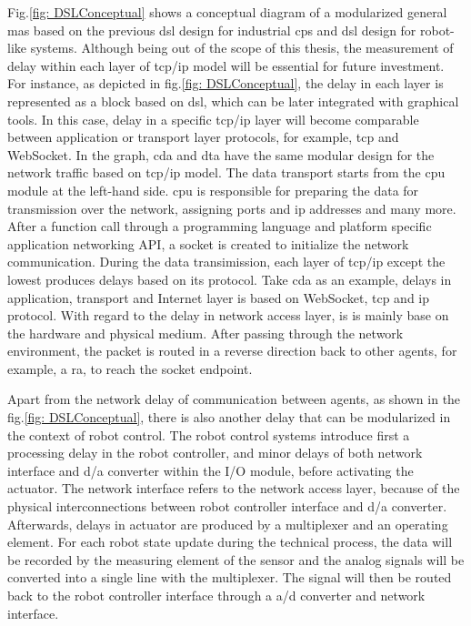 Fig.\ref{fig: DSLConceptual} shows a conceptual diagram of a modularized 
general \gls{mas} based on the previous \gls{dsl} design \cite{hujo_toward_2022} 
for industrial \gls{cps} and \gls{dsl} design for robot-like 
systems\cite{volpert_supporting_nodate}. 
Although being out of the scope of this thesis, the measurement of delay within 
each layer of \gls{tcp/ip} model will be essential for future investment.
For instance, as depicted in fig.\ref{fig: DSLConceptual}, the delay in 
each layer is represented as a block based on \gls{dsl}, which can be later integrated 
with graphical tools.
In this case, delay in a specific \gls{tcp/ip} layer will become comparable between 
application or transport layer protocols, for example, 
\gls{tcp} and WebSocket. In the graph, \gls{cda} and \gls{dta} 
have the same modular design for the network traffic based on \gls{tcp/ip} 
model. The data transport starts from the \gls{cpu} module at the left-hand side. 
\gls{cpu} is responsible for preparing the data for transmission over the network, 
assigning ports and \gls{ip} addresses and many more. After a function call 
through a programming language and platform specific application 
networking API, a socket is created to initialize the network communication. 
During the data transimission, each layer of \gls{tcp/ip} except the lowest 
produces delays 
based on its protocol. Take \gls{cda} as an example, delays in application, 
transport and Internet layer is based on WebSocket, \gls{tcp} and 
\gls{ip} protocol. With regard to the delay in network access layer, is is mainly 
base on the hardware and physical medium. After passing through the network 
environment, the packet is routed in a reverse direction back to other agents, 
for example, a \gls{ra}, to reach the socket endpoint.  



Apart from the network delay of communication between 
agents, as shown in the fig.\ref{fig: DSLConceptual}, there is also another 
delay that can be modularized in 
the context of robot control. The robot control systems introduce first a processing 
delay in the robot controller, and minor delays of both network interface and 
\gls{d/a} converter within the I/O module, before activating 
the actuator. The network interface refers to the network access layer, because of 
the physical interconnections between robot controller interface and \gls{d/a} converter. 
Afterwards, delays in actuator are produced by a multiplexer and an operating element. 
For each robot state update during the technical process, the data will be recorded 
by the measuring element of the sensor and the analog signals will be 
converted into a single line with the multiplexer. The signal will then be routed 
back to the robot controller interface through a \gls{a/d} converter and network interface. 








